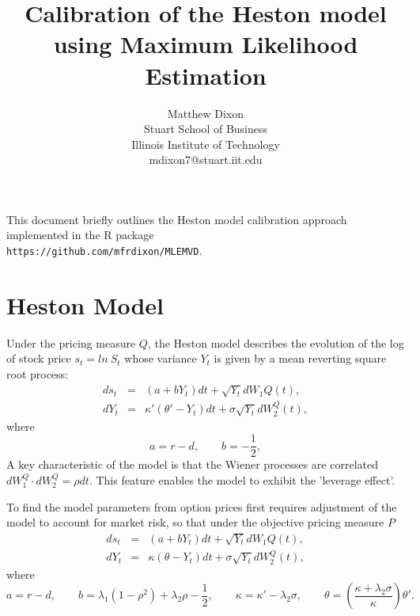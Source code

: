 \documentclass{article}
\newcommand{\be}{\begin{equation}}
\newcommand{\ee}{\end{equation}}
\begin{document}
\setlength{\pdfpageheight}{\paperheight}
\setlength{\pdfpagewidth}{\paperwidth}

\title{Calibration of the Heston model using Maximum Likelihood Estimation}

\author{Matthew Dixon\\
           Stuart School of Business\\
	   Illinois Institute of Technology\\
           mdixon7@stuart.iit.edu}


\maketitle

This document briefly outlines the Heston model calibration approach implemented in the R package\\

 \verb|https://github.com/mfrdixon/MLEMVD|. 

\section{Heston Model} \label{sect:heston}
Under the pricing measure $Q$, the Heston model describes the evolution of the log of stock price $s_t =ln~S_t$ whose variance $Y_t$ is given by a mean reverting square root process:
\begin{eqnarray}
ds_t &=& (a + bY_t)dt  + \sqrt{Y_t}dW_1{Q}(t) ,\\
dY_t &=& \kappa'(\theta' - Y_t)dt  + \sigma \sqrt{Y_t}dW_2^{Q}(t),
\end{eqnarray}
where
\be
a=r-d, \qquad b= -\frac{1}{2},
\ee
A key characteristic of the model is that the Wiener processes are correlated $dW^Q_1\cdot dW_2^Q=\rho dt$. This feature enables the model to exhibit the 'leverage effect'.

To find the model parameters from option prices first requires adjustment of the model to account for market risk, so that under the objective pricing measure $P$
\begin{eqnarray}
ds_t &=& (a + bY_t)dt  + \sqrt{Y_t}dW_1{Q}(t) ,\\
dY_t &=& \kappa(\theta- Y_t)dt  + \sigma \sqrt{Y_t}dW_2^{Q}(t),
\end{eqnarray}
where
\be
a=r-d, \qquad b=\lambda_1(1-\rho^2) + \lambda_2\rho -\frac{1}{2}, \qquad \kappa=\kappa'-\lambda_2\sigma, \qquad \theta=\left(\frac{\kappa +\lambda_2\sigma}{\kappa}\right)\theta'.
\ee
\end{document}
